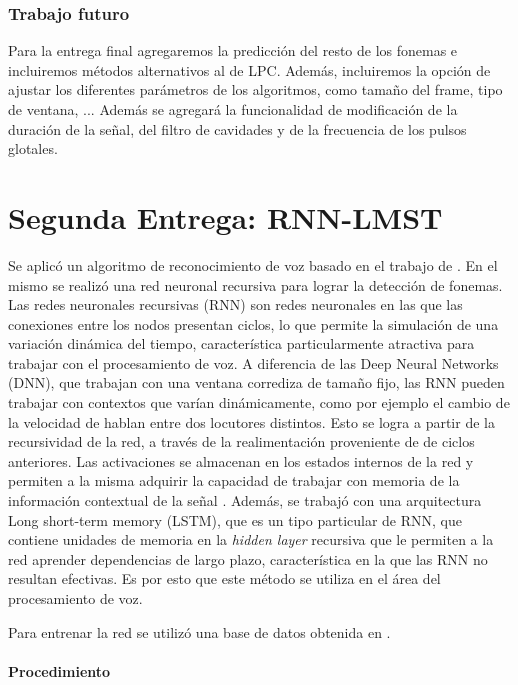 \documentclass{article}
\begin{document}
\section*{Trabajo futuro}

Para la entrega final agregaremos la predicción del resto de los fonemas e incluiremos métodos alternativos al de LPC. Además, incluiremos la opción de ajustar los diferentes parámetros de los algoritmos, como tamaño del frame, tipo de ventana, ... Además se agregará la funcionalidad de modificación de la  duración de la señal, del filtro de cavidades y de la frecuencia de los pulsos glotales.

\part*{Segunda Entrega: RNN-LMST}

Se aplicó un algoritmo de reconocimiento de voz basado en el trabajo de \cite{RNN_HINTON}. En el mismo se realizó una red neuronal recursiva para lograr la detección de fonemas. Las redes neuronales recursivas (RNN) son redes neuronales en las que las conexiones entre los nodos presentan ciclos, lo que permite la simulación de una variación dinámica del tiempo, característica particularmente atractiva para trabajar con el procesamiento de voz. A diferencia de las Deep Neural Networks (DNN), que trabajan con una ventana corrediza de tamaño fijo, las RNN pueden trabajar con contextos que varían dinámicamente, como por ejemplo el cambio de la velocidad de hablan entre dos locutores distintos. Esto se logra a partir de la recursividad de la red, a través de la realimentación proveniente de de ciclos anteriores. Las activaciones se almacenan en los estados internos de la red y permiten a la misma adquirir la capacidad de trabajar con memoria de la información contextual de la señal \cite{sak2014long}. Además, se trabajó con una arquitectura Long short-term memory (LSTM), que es un tipo particular de RNN, que contiene unidades de memoria en la \textit{hidden layer} recursiva que le permiten a la red aprender dependencias de largo plazo, característica en la que las RNN no resultan efectivas. Es por esto que este método se utiliza en el área del procesamiento de voz.


Para entrenar la red se utilizó una base de datos obtenida en \cite{LDC}.

\subsection*{Procedimiento}
\end{document}
